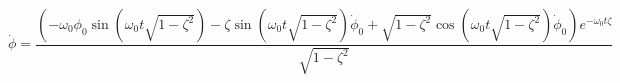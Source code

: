 \begin{equation} \label{eq:analytical_phi1d}
\dot{\phi} = \frac{\left(- \omega_{0} \phi_{0} \operatorname{sin}\left(\omega_{0} t \sqrt{1 - \zeta^{2}}\right) - \zeta \operatorname{sin}\left(\omega_{0} t \sqrt{1 - \zeta^{2}}\right) \dot{\phi}_{0} + \sqrt{1 - \zeta^{2}} \operatorname{cos}\left(\omega_{0} t \sqrt{1 - \zeta^{2}}\right) \dot{\phi}_{0}\right) e^{- \omega_{0} t \zeta}}{\sqrt{1 - \zeta^{2}}}
\end{equation}
